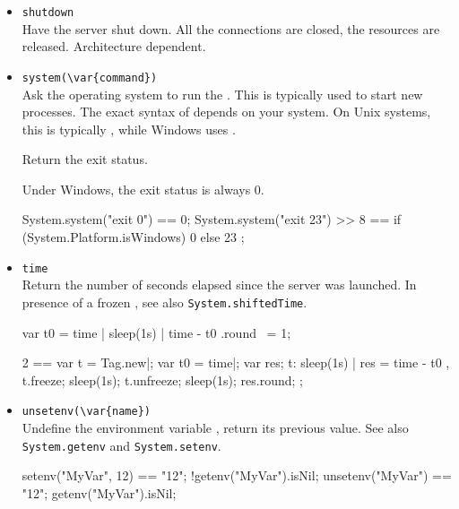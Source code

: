 \begin{itemize}
\item \lstinline|shutdown|\\
  Have the \urbi server shut down.  All the connections are closed,
  the resources are released.  Architecture dependent.

\item \lstinline|system(\var{command})|\\
  Ask the operating system to run the .  This is
  typically used to start new processes.  The exact syntax of
   depends on your system.  On Unix systems, this is
  typically , while Windows uses .

  Return the exit status.

  \begin{windows}
    Under Windows, the exit status is always 0.
  \end{windows}

\begin{urbiassert}
System.system("exit 0") == 0;
System.system("exit 23") >> 8
       == { if (System.Platform.isWindows) 0 else 23 };
\end{urbiassert}


\item \lstinline|time|\\
  Return the number of seconds elapsed since the \urbi server was
  launched.  In presence of a frozen , see also
  \lstinline|System.shiftedTime|.
\begin{urbiassert}
{ var t0 = time | sleep(1s) | time - t0 }.round ~= 1;

  2 ==
  {
    var t = Tag.new|;
    var t0 = time|;
    var res;
    t: { sleep(1s) | res = time - t0 },
    t.freeze;
    sleep(1s);
    t.unfreeze;
    sleep(1s);
    res.round;
  };
\end{urbiassert}

\item \lstinline|unsetenv(\var{name})|\\
  Undefine the environment variable , return its previous
  value.  See also \lstinline|System.getenv| and
  \lstinline|System.setenv|.

\begin{urbiassert}
setenv("MyVar", 12) == "12";
!getenv("MyVar").isNil;
unsetenv("MyVar") == "12";
getenv("MyVar").isNil;
\end{urbiassert}


\end{itemize}

